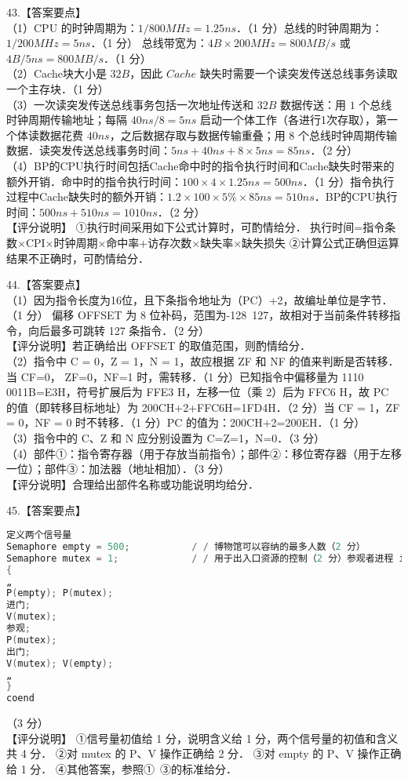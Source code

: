 43.【答案要点】 \\
（1）CPU 的时钟周期为：$1/800MHz = 1.25ns$．（1 分）总线的时钟周期为：$1/200MHz = 5ns$．（1 分） 
总线带宽为：$4B\times200MHz = 800MB/s$ 或 $4B/5ns = 800MB/s$．（1 分） \\
（2）Cache块大小是 $32B$，因此 $Cache$ 缺失时需要一个读突发传送总线事务读取一个主存块．（1 分）  \\
（3）一次读突发传送总线事务包括一次地址传送和 $32B$ 数据传送：用 $1$ 个总线时钟周期传输地址；每隔 $40ns/8 = 5ns$ 启动一个体工作（各进行1次存取），第一个体读数据花费 $40ns$，之后数据存取与数据传输重叠；用 $8$ 个总线时钟周期传输数据．读突发传送总线事务时间：$5ns + 40ns + 8\times5ns = 85ns$．（2 分） \\
（4）BP的CPU执行时间包括Cache命中时的指令执行时间和Cache缺失时带来的额外开销．命中时的指令执行时间：$100\times4\times1.25ns = 500ns$．（1 分）指令执行过程中Cache缺失时的额外开销：$1.2\times100\times5\%\times85ns = 510ns$．BP的CPU执行时间：$500ns + 510ns = 1010ns$．（2 分） \\
【评分说明】
①执行时间采用如下公式计算时，可酌情给分． 执行时间=指令条数×CPI×时钟周期×命中率+访存次数×缺失率×缺失损失 
②计算公式正确但运算结果不正确时，可酌情给分． 

44.【答案要点】 \\
（1）因为指令长度为16位，且下条指令地址为（PC）+2，故编址单位是字节．（1 分） 偏移 OFFSET 为 8 位补码，范围为-128~127，故相对于当前条件转移指令，向后最多可跳转 127 条指令．（2 分）  \\
【评分说明】若正确给出 OFFSET 的取值范围，则酌情给分．  \\
（2）指令中 C = 0，Z = 1，N = 1，故应根据 ZF 和 NF 的值来判断是否转移．当 CF=0， ZF=0，NF=1 时，需转移．（1 分）已知指令中偏移量为 1110 0011B=E3H，符号扩展后为 FFE3 H，左移一位（乘 2）后为 FFC6 H，故 PC 的值（即转移目标地址）为 200CH+2+FFC6H=1FD4H．（2 分）当 CF = 1，ZF = 0，NF = 0 时不转移．（1 分）PC 的值为：200CH+2=200EH．（1 分）  \\
（3）指令中的 C、Z 和 N 应分别设置为 C=Z=1，N=0．（3 分）  \\
（4）部件①：指令寄存器（用于存放当前指令）；部件②：移位寄存器（用于左移一位）；部件③：加法器（地址相加）．（3 分）  \\
【评分说明】合理给出部件名称或功能说明均给分．

45.【答案要点】 \\
\begin{lstlisting}[language=cpp]
定义两个信号量
Semaphore empty = 500;           / / 博物馆可以容纳的最多人数（2 分） 
Semaphore mutex = 1;             / / 用于出入口资源的控制（2 分）参观者进程 i; 
{  
„ 
P(empty); P(mutex); 
进门; 
V(mutex);
参观; 
P(mutex); 
出门; 
V(mutex); V(empty);
„ 
} 
coend
\end{lstlisting}
（3 分） \\
【评分说明】 
①信号量初值给 1 分，说明含义给 1 分，两个信号量的初值和含义共 4 分． 
②对 mutex 的 P、V 操作正确给 2 分． 
③对 empty 的 P、V 操作正确给 1 分． 
④其他答案，参照①~③的标准给分．


